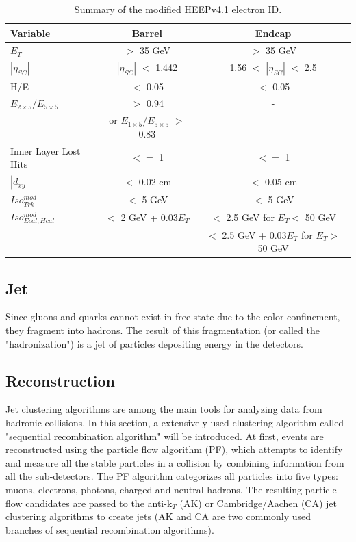 \begin{table}[hbtp]
  \begin{center}
    \begin{tabular}{|l|c|c|}
      \hline
      Variable & Barrel & Endcap \\\hline
      $E_{T}$ & $>$ 35 GeV & $>$ 35 GeV \\
      $|\eta_{SC}|$ & $|\eta_{SC}|$ $<$ 1.442 & 1.56 $<$ $|\eta_{SC}|$ $<$ 2.5 \\
      H/E & $<$ 0.05 & $<$ 0.05 \\ 
      $E_{2\times5}/E_{5\times5}$ & $>$ 0.94 & - \\
      & or $E_{1\times5}/E_{5\times5}$ $>$ 0.83 & \\ 
      Inner Layer Lost Hits & $<=$ 1 & $<=$ 1 \\
      $|d_{xy}|$ & $<$ 0.02 cm & $<$ 0.05 cm\\
      \hline
      $Iso_{Trk}^{mod}$  & $<$ 5 GeV& $<$ 5 GeV\\
      \hline
      $Iso_{Ecal, Hcal}^{mod}$  & $<$ 2 GeV + 0.03$E_{T}$ & $<$ 2.5 GeV for $E_{T} <$ 50 GeV \\
      & & $<$ 2.5 GeV + 0.03$E_{T}$ for $E_{T} >$ 50 GeV \\
      \hline
    \end{tabular}
    \caption{\label{tab:EleIDtable} Summary of the modified HEEPv4.1 electron ID.}
  \end{center}
\end{table}

\newpage
\subsection{Jet}
Since gluons and quarks cannot exist in free state due to the color confinement\cite{confinement}, they fragment into hadrons. The result of this fragmentation (or called the "hadronization") is a jet of particles depositing energy in the detectors.

\subsection*{Reconstruction}
Jet clustering algorithms are among the main tools for analyzing data from hadronic collisions. In this section, a extensively used clustering algorithm called "sequential recombination algorithm"\cite{AKalgo,CAalgo1} will be introduced. At first, events are reconstructed using the particle flow algorithm (PF)\cite{PFalgo}, which attempts to identify and measure all the stable particles in a collision by combining information from all the sub-detectors. The PF algorithm categorizes all particles into five types: muons, electrons, photons, charged and neutral hadrons. The resulting particle flow candidates are passed to the anti-k$_{T}$ (AK)\cite{AKalgo} or Cambridge/Aachen (CA)\cite{CAalgo1,CAalgo2} jet clustering algorithms to create jets (AK and CA are two commonly used branches of sequential recombination algorithms).

